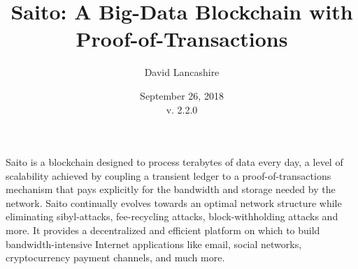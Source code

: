 \documentclass[11.5pt, oneside]{article}   	%
\title{Saito: A Big-Data Blockchain with Proof-of-Transactions}
\author{David Lancashire}
\date{September 26, 2018\\v. 2.2.0}
\begin{document}
\maketitle


\begin{onecolabstract}
Saito is a blockchain designed to process terabytes of data every day, a level of scalability achieved by coupling a transient ledger to a proof-of-transactions mechanism that pays explicitly for the bandwidth and storage needed by the network. Saito continually evolves towards an optimal network structure while eliminating sibyl-attacks, fee-recycling attacks, block-withholding attacks and more. It provides a decentralized and efficient platform on which to build bandwidth-intensive Internet applications like email, social networks, cryptocurrency payment channels, and much more.
\end{onecolabstract}
\end{document}
